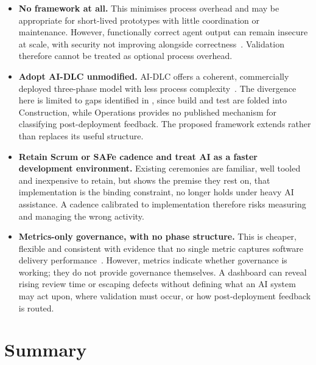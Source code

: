 \begin{itemize}[leftmargin=0.6cm, itemsep=0.4em]

\item \textbf{No framework at all.} This minimises process overhead and may be appropriate for short-lived prototypes with little coordination or maintenance. However, functionally correct agent output can remain insecure at scale, with security not improving alongside correctness~\cite{Zhao:2025vibe, Veracode:2025gen}. Validation therefore cannot be treated as optional process overhead.

\item \textbf{Adopt \ac{AI-DLC} unmodified.} \ac{AI-DLC} offers a coherent, commercially deployed three-phase model with less process complexity~\cite{AWS:2025aidlc}. The divergence here is limited to gaps identified in , since build and test are folded into Construction, while Operations provides no published mechanism for classifying post-deployment feedback. The proposed framework extends rather than replaces its useful structure.

\item \textbf{Retain Scrum or SAFe cadence and treat \ac{AI} as a faster development environment.} Existing ceremonies are familiar, well tooled and inexpensive to retain, but  shows the premise they rest on, that implementation is the binding constraint, no longer holds under heavy AI assistance. A cadence calibrated to implementation therefore risks measuring and managing the wrong activity.

\item \textbf{Metrics-only governance, with no phase structure.} This is cheaper, flexible and consistent with evidence that no single metric captures software delivery performance~\cite{Forsgren:2021sp}. However, metrics indicate whether governance is working; they do not provide governance themselves. A dashboard can reveal rising review time or escaping defects without defining what an AI system may act upon, where validation must occur, or how post-deployment feedback is routed.

\end{itemize}

\section{Summary}
\label{sec:proposal_summary}

